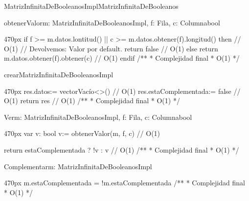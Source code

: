 \documentclass[10pt,a4paper]{article}
\begin{document}
\begin{ModuloImplements}{MatrizInfinitaDeBooleanosImpl}{MatrizInfinitaDeBooleanos}

  \begin{proc}{obtenerValor}{\In m: MatrizInfinitaDeBooleanosImpl, \In f: Fila, \In c: Columna}{bool}
    \begin{ImplementationCode}{470px}
      if f >= m.datos.lontitud() || c >= m.datos.obtener(f).longitud() then // O(1)
        // Devolvemos: Valor por default.
        return false // O(1)
      else
        return m.datos.obtener(f).obtener(c) // O(1)
      endif
      /**
       * Complejidad final
       * O(1)
       */
    \end{ImplementationCode}
  \end{proc}

  \begin{proc}{crear}{}{MatrizInfinitaDeBooleanosImpl}
    \begin{ImplementationCode}{470px}
      res.datos:= vectorVacío<>() // O(1)
      res.estaComplementada:= false // O(1)
      return res // O(1)
      /**
       * Complejidad final
       * O(1)
       */
    \end{ImplementationCode}
  \end{proc}

  \begin{proc}{Ver}{\Inout m: MatrizInfinitaDeBooleanosImpl, \In f: Fila, \In c: Columna}{bool}
    \begin{ImplementationCode}{470px}
      var v: bool
          v:= obtenerValor(m, f, c) // O(1)
      
      return estaComplementada ? !v : v // O(1)
      /**
       * Complejidad final
       * O(1)
       */
      \end{ImplementationCode}
  \end{proc}

  \begin{proc}{Complementar}{\Inout m: MatrizInfinitaDeBooleanosImpl}{}
    \begin{ImplementationCode}{470px}
      m.estaComplementada = !m.estaComplementada
      /**
       * Complejidad final
       * O(1)
       */
    \end{ImplementationCode}
  \end{proc}
\end{ModuloImplements}

\newpage


\end{document}
